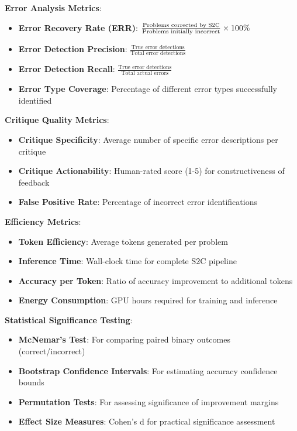 \documentclass[10pt,twocolumn]{article}
\newcommand{\ssc}{\textsc{S2C}}
\begin{document}
\textbf{Error Analysis Metrics}:
\begin{itemize}[leftmargin=*]
\item \textbf{Error Recovery Rate (ERR)}: $\frac{\text{Problems corrected by } \ssc{}}{\text{Problems initially incorrect}} \times 100\%$
\item \textbf{Error Detection Precision}: $\frac{\text{True error detections}}{\text{Total error detections}}$
\item \textbf{Error Detection Recall}: $\frac{\text{True error detections}}{\text{Total actual errors}}$
\item \textbf{Error Type Coverage}: Percentage of different error types successfully identified
\end{itemize}

\textbf{Critique Quality Metrics}:
\begin{itemize}[leftmargin=*]
\item \textbf{Critique Specificity}: Average number of specific error descriptions per critique
\item \textbf{Critique Actionability}: Human-rated score (1-5) for constructiveness of feedback
\item \textbf{False Positive Rate}: Percentage of incorrect error identifications
\end{itemize}

\textbf{Efficiency Metrics}:
\begin{itemize}[leftmargin=*]
\item \textbf{Token Efficiency}: Average tokens generated per problem
\item \textbf{Inference Time}: Wall-clock time for complete \ssc{} pipeline
\item \textbf{Accuracy per Token}: Ratio of accuracy improvement to additional tokens
\item \textbf{Energy Consumption}: GPU hours required for training and inference
\end{itemize}

\textbf{Statistical Significance Testing}:
\begin{itemize}[leftmargin=*]
\item \textbf{McNemar's Test}: For comparing paired binary outcomes (correct/incorrect)
\item \textbf{Bootstrap Confidence Intervals}: For estimating accuracy confidence bounds
\item \textbf{Permutation Tests}: For assessing significance of improvement margins
\item \textbf{Effect Size Measures}: Cohen's d for practical significance assessment
\end{itemize}
\end{document}
